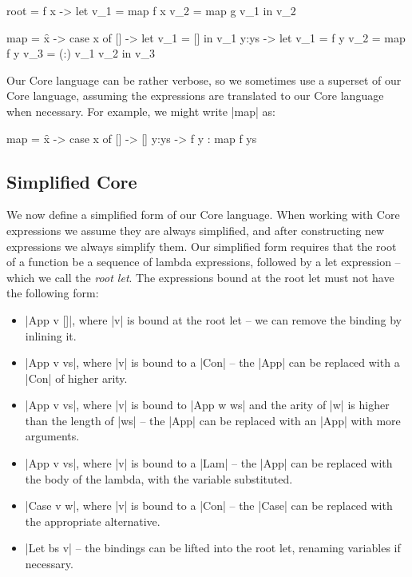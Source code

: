 \documentclass[draft]{sigplanconf}
\begin{document}
\begin{code}
root = \g f x ->  let  v_1 =  map f x
                       v_2 =  map g v_1
                  in   v_2
\end{code}\begin{code}
map = \f x -> case  x of
                    []    ->   let  v_1 = []
                               in   v_1
                    y:ys  ->   let  v_1 = f y
                                    v_2 = map f y
                                    v_3 = (:) v_1 v_2
                               in   v_3
\end{code}

Our Core language can be rather verbose, so we sometimes use a superset of our Core language, assuming the expressions are translated to our Core language when necessary. For example, we might write |map| as:

\begin{code}
map = \f x -> case  x of
                    []    -> []
                    y:ys  -> f y : map f ys
\end{code}

\subsection{Simplified Core}
\label{sec:simplify}

We now define a simplified form of our Core language. When working with Core expressions we assume they are always simplified, and after constructing new expressions we always simplify them. Our simplified form requires that the root of a function be a sequence of lambda expressions, followed by a let expression -- which we call the \textit{root let}. The expressions bound at the root let must not have the following form:

\begin{itemize}
\item |App v []|, where |v| is bound at the root let -- we can remove the binding by inlining it.
\item |App v vs|, where |v| is bound to a |Con| -- the |App| can be replaced with a |Con| of higher arity.
\item |App v vs|, where |v| is bound to |App w ws| and the arity of |w| is higher than the length of |ws| -- the |App| can be replaced with an |App| with more arguments.
\item |App v vs|, where |v| is bound to a |Lam| -- the |App| can be replaced with the body of the lambda, with the variable substituted.
\item |Case v w|, where |v| is bound to a |Con| -- the |Case| can be replaced with the appropriate alternative.
\item |Let bs v| -- the bindings can be lifted into the root let, renaming variables if necessary.
\end{itemize}
\end{document}
